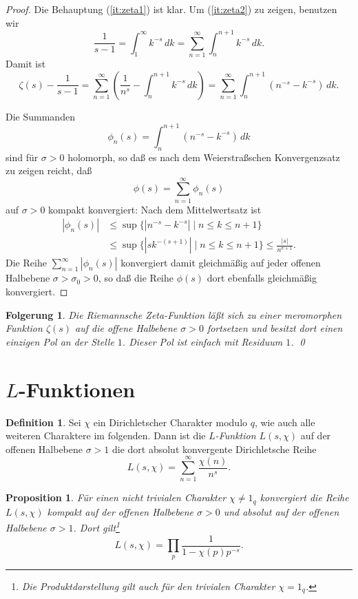 \documentclass[a4paper,twoside,openright]{report}
\newtheorem{prop}[thm]{Proposition}
\newtheorem{cor}[thm]{Folgerung}
\theoremstyle{definition}
\newtheorem{dfn}[thm]{Definition}
\theoremstyle{remark}
\begin{document}
\begin{proof}
  Die Behauptung (\ref{it:zeta1}) ist klar. Um (\ref{it:zeta2}) zu zeigen,
  benutzen wir
  \[
    \frac 1 {s - 1}
    = \int_1^\infty k^{-s} \, dk = \sum_{n = 1}^\infty \int_n^{n + 1} k^{-s} \, dk.
  \]
  Damit ist
  \[
    \zeta(s) - \frac 1 {s - 1} = 
    \sum_{n = 1}^\infty\left(\frac 1 {n^s} - \int_n^{n + 1} k^{-s} \, dk\right)
    = \sum_{n = 1}^\infty \int_n^{n + 1} (n^{-s} - k^{-s}) \, dk.
  \]
  
  Die Summanden
  \[
    \phi_n(s) = \int_n^{n + 1} (n^{-s} - k^{-s}) \, dk
  \]
  sind für $\sigma > 0$ holomorph, so daß es nach dem Weierstraßschen Konvergenzsatz
  zu zeigen reicht, daß
  \[
    \phi(s) = \sum_{n = 1}^\infty \phi_n(s)
  \]
  auf $\sigma > 0$ kompakt konvergiert: Nach dem Mittelwertsatz ist
  \[
    \begin{split}
      |\phi_n(s)| & \leq \sup \{|n^{-s} - k^{-s}| \mid n \leq k \leq n + 1\} \\
      &
      \leq \sup \{|s k^{-(s + 1)}| \mid n \leq k \leq n + 1\} 
      \leq \frac{|s|}{n^{\sigma + 1}}.
    \end{split}
  \]
  Die Reihe $\sum_{n = 1}^\infty |\phi_n(s)|$
  konvergiert damit gleichmäßig auf jeder offenen Halbebene $\sigma > \sigma_0 > 0$, 
  so daß die Reihe $\phi(s)$ dort ebenfalls gleichmäßig konvergiert.
\end{proof}

\begin{cor}
  Die Riemannsche Zeta-Funktion läßt sich zu einer meromorphen Funktion
  $\zeta(s)$ auf die offene Halbebene $\sigma > 0$ fortsetzen und besitzt
  dort einen einzigen Pol an der Stelle $1$. Dieser Pol ist einfach mit
  Residuum $1$.
  \qed
\end{cor}

\section{$L$-Funktionen}

\begin{dfn}
  Sei $\chi$ ein Dirichletscher Charakter modulo $q$, wie auch alle weiteren Charaktere im folgenden. Dann
  ist die \emph{$L$-Funktion $L(s, \chi)$} auf der offenen Halbebene $\sigma > 1$ 
  die dort absolut konvergente Dirichletsche Reihe 
  \[
    L(s, \chi) = \sum_{n = 1}^\infty \frac{\chi(n)}{n^s}.
  \]
\end{dfn}

\begin{prop}
  Für einen nicht trivialen Charakter $\chi \neq 1_q$ konvergiert die Reihe
  $L(s, \chi)$
  kompakt auf der offenen Halbebene $\sigma > 0$ und absolut auf der offenen Halbebene
  $\sigma > 1$. Dort gilt\footnote{Die Produktdarstellung gilt auch für den
  trivialen Charakter $\chi = 1_q$.}
  \[
    L(s, \chi) = \prod_p \frac 1 {1 - \chi(p) p^{-s}}.
  \]
\end{prop}
\end{document}
